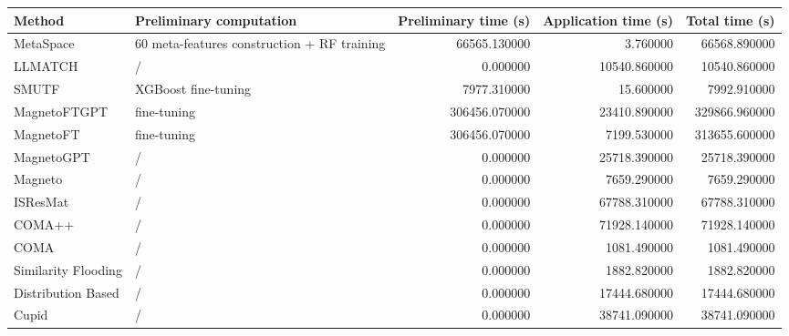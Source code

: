 \begin{tabular}{llrrr}
\toprule
Method & Preliminary computation & Preliminary time (s) & Application time (s) & Total time (s) \\
\midrule
MetaSpace & 60 meta-features construction + RF training & 66565.130000 & 3.760000 & 66568.890000 \\
LLMATCH & / & 0.000000 & 10540.860000 & 10540.860000 \\
SMUTF & XGBoost fine-tuning & 7977.310000 & 15.600000 & 7992.910000 \\
MagnetoFTGPT & fine-tuning & 306456.070000 & 23410.890000 & 329866.960000 \\
MagnetoFT & fine-tuning & 306456.070000 & 7199.530000 & 313655.600000 \\
MagnetoGPT & / & 0.000000 & 25718.390000 & 25718.390000 \\
Magneto & / & 0.000000 & 7659.290000 & 7659.290000 \\
ISResMat & / & 0.000000 & 67788.310000 & 67788.310000 \\
COMA++ & / & 0.000000 & 71928.140000 & 71928.140000 \\
COMA & / & 0.000000 & 1081.490000 & 1081.490000 \\
Similarity Flooding & / & 0.000000 & 1882.820000 & 1882.820000 \\
Distribution Based & / & 0.000000 & 17444.680000 & 17444.680000 \\
Cupid & / & 0.000000 & 38741.090000 & 38741.090000 \\
\bottomrule
\end{tabular}

